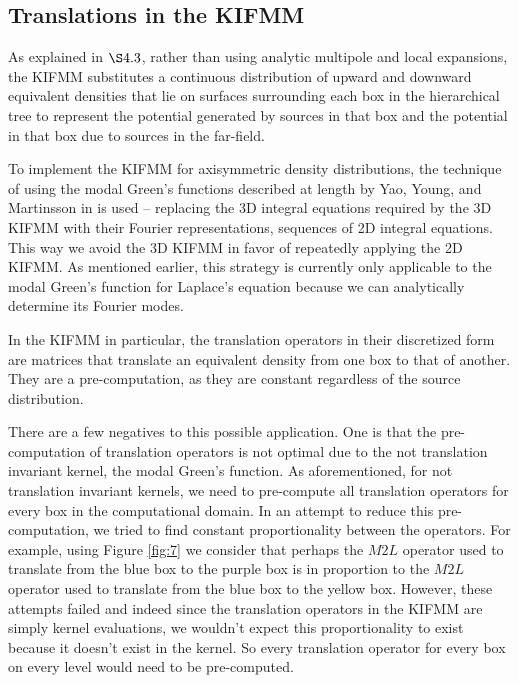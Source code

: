 \documentclass[11pt, oneside]{article}   	%
\begin{document}
\subsection{Translations in the KIFMM}
As explained in $\S4.3$, rather than using analytic multipole and local expansions, the KIFMM substitutes a continuous distribution of upward and downward equivalent densities that lie on surfaces surrounding each box in the hierarchical tree to represent the potential generated by sources in that box and the potential in that box due to sources in the far-field.

To implement the KIFMM for axisymmetric density distributions, the technique of using the modal Green's functions described at length by Yao, Young, and Martinsson in \cite{YYM} is used -- replacing the 3D integral equations required by the 3D KIFMM with their Fourier representations, sequences of 2D integral equations. This way we avoid the 3D KIFMM in favor of repeatedly applying the 2D KIFMM. As mentioned earlier, this strategy is currently only applicable to the modal Green's function for Laplace's equation because we can analytically determine its Fourier modes.

In the KIFMM in particular, the translation operators in their discretized form are matrices that translate an equivalent density from one box to that of another. They are a pre-computation, as they are constant regardless of the source distribution.

There are a few negatives to this possible application. One is that the pre-computation of translation operators is not optimal due to the not translation invariant kernel, the modal Green's function. As aforementioned, for not translation invariant kernels, we need to pre-compute all translation operators for every box in the computational domain. In an attempt to reduce this pre-computation, we tried to find constant proportionality between the operators. For example, using Figure \ref{fig:7} we consider that perhaps the $M2L$ operator used to translate from the blue box to the purple box is in proportion to the $M2L$ operator used to translate from the blue box to the yellow box. However, these attempts failed and indeed since the translation operators in the KIFMM are simply kernel evaluations, we wouldn't expect this proportionality to exist because it doesn't exist in the kernel. So every translation operator for every box on every level would need to be pre-computed.
\end{document}
